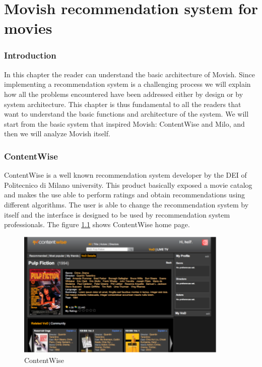 \chapter{Movish recommendation system for movies}
\label{chapter:<movish_system>}

\subsection{Introduction}
\label{sec:movish_introduction}

In this chapter the reader can understand the basic architecture of Movish. Since implementing a recommendation system is a challenging process we will explain how all the problems encountered have been addressed either by design or by system architecture. This chapter is thus fundamental to all the readers that want to understand the basic functions and architecture of the system.
We will start from the basic system that inspired Movish: ContentWise and Milo, and then we will analyze Movish itself.

\subsection{ContentWise}
\label{sec:contentwise}

ContentWise is a well known recommendation system developer by the \ac{DEI} of Politecnico di Milano university. This product basically exposed a movie catalog and makes the use able to perform ratings and obtain recommendations using different algorithms. The user is able to change the recommendation system by itself and the interface is designed to be used by recommendation system professionals. The figure \ref{fig:contentwise} shows ContentWise home page.    

\begin{figure}
  \centering
  \includegraphics[width=0.9\textwidth]{figures/contentwise-homepage.png}
  \caption{ContentWise}
  \label{fig:contentwise}
\end{figure}

